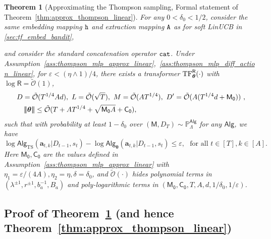 \documentclass[10pt]{article}
\newtheorem{theorem}{Theorem}
\newcommand{\eps}{\varepsilon}
\newcommand{\<}{\left\langle}
\renewcommand{\>}{\right\rangle}
\newcommand{\TF}{{\rm TF}}
\newcommand{\nrmp}[1]{{\left|\!\left|\!\left|{#1}\right|\!\right|\!\right|}}
\renewcommand{\P}{\mathbb{P}}
\newcommand{\inst}{{\mathsf{M}}}
\newcommand{\TS}{{\mathrm{TS}}}
\newcommand{\Tpsparn}{{r}}
\newcommand{\trunprob}{{\eta_1}}
\newcommand{\Trunregpa}{{\eta_2}}
\newcommand{\Trunregp}{{\eta}}
\newcommand{\tcO}{{\tilde{\mathcal O}}}
\newcommand{\state}{{s}}
\newcommand{\totlen}{{T}}
\newcommand{\cat}{{\tt cat}}
\newcommand{\extractmap}{{\tt A}}
\newcommand{\embedmap}{{\tt h}}
\newcommand{\sAlg}{{\mathsf{Alg}}}
\newcommand{\dset}{{D}}
\newcommand{\prior}{{\Lambda}}
\newcommand{\tfpar}{{\btheta}}
\newcommand{\hidden}{{D'}}
\newcommand{\clipval}{{\mathsf{R}}}
\newcommand{\neuron}{{\mathsf{M_0}}}
\newcommand{\weightn}{{{\mathsf{C_0}}}}
\def\btheta{{\boldsymbol \theta}}
\def\ba{{\mathbf a}}
\begin{document}
\begin{theorem}[Approximating the Thompson sampling, Formal statement of Theorem~\ref{thm:approx_thompson_linear}]\label{thm:approx_thompson_linear-formal}
For any $0<\delta_0<1/2$, consider the same embedding mapping $\embedmap$ and extraction mapping $\extractmap$ as for soft LinUCB in \ref{sec:tf_embed_bandit},

and consider the standard concatenation operator $\cat$. Under Assumption~\ref{ass:thompson_mlp_approx_linear},~\ref{ass:thompson_mlp_diff_action_linear}, for $\eps<(\Trunregp\wedge1)/4$, there exists a  transformer $\TF_\btheta^{\clipval}(\cdot)$ with $\log \clipval = \tcO(1)$, 
\begin{align}
&D=\tcO(T^{1/4}Ad),~L= \tcO(\sqrt{T}),~ M =\tcO(AT^{1/4}),~\hidden=\tcO(A(T^{1/4}d+\neuron))~,\notag\\
&~~~\nrmp{\btheta}\leq \tcO(T+AT^{1/4}+\sqrt{ \neuron A}+\weightn),\label{eq:ts_tf_param-formal}
\end{align} 
such that with probability at least $1-\delta_0$ over $(\inst, \dset_{\totlen}) \sim \P_{\prior}^{\sAlg}$ for any $\sAlg$, we have
\[
\log \sAlg_{\TS}(\ba_{t,k}|\dset_{t-1},\state_t) - \log \sAlg_{\tfpar}(\ba_{t,k}|\dset_{t-1},\state_t) \leq \eps, ~~~ \text{for all } t\in[T],k\in[A].
\]
Here  $\neuron,\weightn$ are the values defined in   Assumption~\ref{ass:thompson_mlp_approx_linear} with $\trunprob=\eps/(4A),\Trunregpa=\Trunregp,\delta=\delta_0$, and $\tcO(\cdot)$ hides polynomial terms in $(\lambda^{\pm1},\Tpsparn^{\pm1},b_a^{-1},B_a)$ and poly-logarithmic terms in $(\neuron,\weightn,\totlen,A,d,1/\delta_0,1/\eps)$.
\end{theorem}






































\subsection{Proof of Theorem~\ref{thm:approx_thompson_linear-formal} (and hence Theorem~\ref{thm:approx_thompson_linear}) }\label{sec:pf_thm:approx_thompson_linear-formal}
\end{document}
